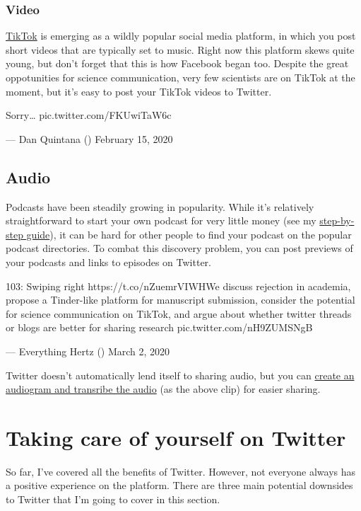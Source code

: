 \documentclass[]{book}
\begin{document}
\hypertarget{video}{%
\subsection{Video}\label{video}}

\href{https://www.tiktok.com/en/}{TikTok} is emerging as a wildly popular social media platform, in which you post short videos that are typically set to music. Right now this platform skews quite young, but don't forget that this is how Facebook began too. Despite the great oppotunities for science communication, very few scientists are on TikTok at the moment, but it's easy to post your TikTok videos to Twitter.

Sorry\ldots{} pic.twitter.com/FKUwiTaW6c

--- Dan Quintana (\citet{dsquintana}) February 15, 2020

\hypertarget{audio}{%
\section{Audio}\label{audio}}

Podcasts have been steadily growing in popularity. While it's relatively straightforward to start your own podcast for very little money (see my \href{https://www.dsquintana.blog/podcast-guide/}{step-by-step guide}), it can be hard for other people to find your podcast on the popular podcast directories. To combat this discovery problem, you can post previews of your podcasts and links to episodes on Twitter.

103: Swiping right https://t.co/nZuemrVIWHWe discuss rejection in academia, propose a Tinder-like platform for manuscript submission, consider the potential for science communication on TikTok, and argue about whether twitter threads or blogs are better for sharing research pic.twitter.com/nH9ZUMSNgB

--- Everything Hertz (\citet{hertzpodcast}) March 2, 2020

Twitter doesn't automatically lend itself to sharing audio, but you can \href{https://www.dsquintana.blog/podcast-guide/}{create an audiogram and transribe the audio} (as the above clip) for easier sharing.

\hypertarget{care}{%
\chapter{Taking care of yourself on Twitter}\label{care}}

So far, I've covered all the benefits of Twitter. However, not everyone always has a positive experience on the platform. There are three main potential downsides to Twitter that I'm going to cover in this section.
\end{document}
